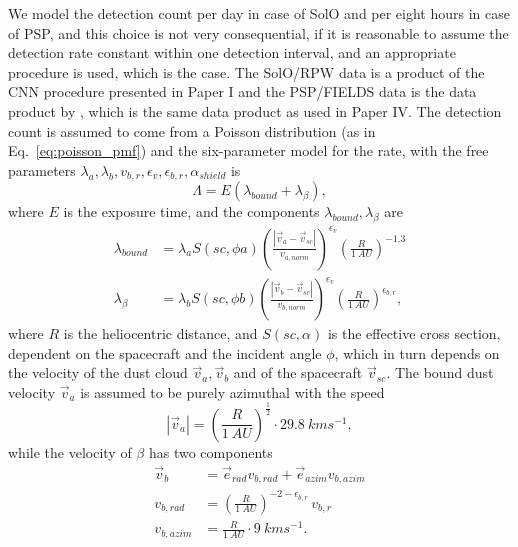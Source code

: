 We model the detection count per day in case of SolO and per eight hours in case of PSP, and this choice is not very consequential, if it is reasonable to assume the detection rate constant within one detection interval, and an appropriate procedure is used, which is the case. The SolO/RPW data is a product of the CNN procedure presented in Paper I and the PSP/FIELDS data is the data product by \citet{malaspina2023dust}, which is the same data product as used in Paper IV. The detection count is assumed to come from a Poisson distribution (as in Eq.~\ref{eq:poisson_pmf}) and the six-parameter model for the rate, with the free parameters $\lambda_a, \lambda_b, v_{b,r}, \epsilon_v, \epsilon_{b,r}, \alpha_{shield}$ is 
\begin{equation}
    \Lambda = E (\lambda_{bound} + \lambda_{\beta}),
\end{equation}
where $E$ is the exposure time, and the components $\lambda_{bound},\lambda_{\beta}$ are
\begin{equation}\begin{split}
    \lambda_{bound} &= \lambda_a  S(sc,\phi{a}) \left( \frac{|\vec{v}_{a} - \vec{v}_{sc}|}{v_{a,norm}}\right)^{\epsilon_v} \left( \frac{R}{\SI{1}{AU}} \right)^{-1.3} \\
    \lambda_{\beta} &= \lambda_b S(sc,\phi{b}) \left( \frac{|\vec{v}_{b} - \vec{v}_{sc}|}{v_{b,norm}}\right)^{\epsilon_v} \left( \frac{R}{\SI{1}{AU}} \right)^{\epsilon_{b,r}},
\end{split}\end{equation}
where $R$ is the heliocentric distance, and $S(sc,\alpha)$ is the effective cross section, dependent on the spacecraft and the incident angle $\phi$, which in turn depends on the velocity of the dust cloud $\vec{v}_a,\vec{v}_b$ and of the spacecraft $\vec{v}_{sc}$. The bound dust velocity $\vec{v}_a$ is assumed to be purely azimuthal with the speed
\begin{equation}
    |\vec{v}_a| = \left( \frac{R}{\SI{1}{AU}} \right)^\frac{1}{2} \cdot \SI{29.8}{kms^{-1}},
\end{equation}
while the velocity of $\beta$ has two components
\begin{equation}\begin{split}
    \vec{v}_b &= \vec{e}_{rad} v_{b,rad} + \vec{e}_{azim} v_{b,azim} \\
    v_{b,rad} &= \left( \frac{R}{\SI{1}{AU}} \right)^{-2-\epsilon_{b,r}} \, v_{b,r} \\
    v_{b,azim} &= \frac{R}{\SI{1}{AU}} \cdot \SI{9}{kms^{-1}}.
\end{split}\end{equation}
